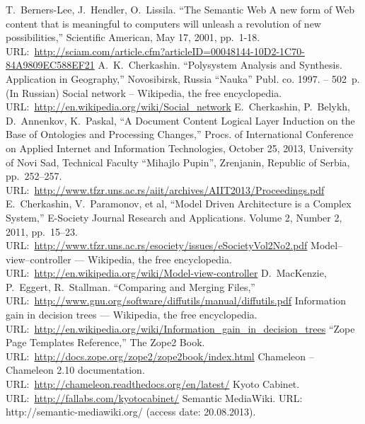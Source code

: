 \documentclass[conference]{IEEEtran}
\begin{document}
%
%
%
\vspace{1.4em} %
\begin{thebibliography}{11}
 T.~Berners-Lee, J.~Hendler, O.~Lissila. ``The
  Semantic Web A new form of Web content that is meaningful to
  computers will unleash a revolution of new possibilities,''
  Scientific American, May 17, 2001,
  pp.~1-18. URL:~\url{http://sciam.com/article.cfm?articleID=00048144-10D2-1C70-84A9809EC588EF21}
 A.~K.~Cherkashin. ``Polysystem Analysis and
  Synthesis. Application in Geography,'' Novosibirsk, Russia ``Nauka'' Publ. co.
  1997. -- 502~p. (In Russian)
 Social network -- Wikipedia, the free encyclopedia.
  URL:~\url{http://en.wikipedia.org/wiki/Social_network}
 E.~Cherkashin, P.~Belykh, D.~Annenkov, K.~Paskal, ``A
  Document Content Logical Layer Induction on the Base of Ontologies
  and Processing Changes,'' Procs. of International Conference on
  Applied Internet and Information Technologies, October 25, 2013,
  University of Novi Sad, Technical Faculty ``Mihajlo Pupin'',
  Zrenjanin, Republic of Serbia,
  pp.~252--257. URL:~\url{http://www.tfzr.uns.ac.rs/aiit/archives/AIIT2013/Proceedings.pdf}
 E.~Cherkashin, V.~Paramonov, et al, ``Model Driven
  Architecture is a Complex System,'' E-Society Journal Research and
  Applications. Volume 2, Number 2, 2011, pp.~15--23.
  URL:~\url{http://www.tfzr.uns.ac.rs/esociety/issues/eSocietyVol2No2.pdf}
 Model--view--controller --- Wikipedia, the free
  encyclopedia.
  URL:~\url{http://en.wikipedia.org/wiki/Model-view-controller}
 D.~MacKenzie, P.~Eggert, R.~Stallman. ``Comparing and
  Merging Files,''
  URL:~\url{http://www.gnu.org/software/diffutils/manual/diffutils.pdf}
 Information gain in decision trees ---  Wikipedia, the free
  encyclopedia. URL:~\url{http://en.wikipedia.org/wiki/Information_gain_in_decision_trees}
 ``Zope Page Templates Reference,'' The Zope2 Book. URL:~\url{http://docs.zope.org/zope2/zope2book/index.html}
 Chameleon -- Chameleon 2.10 documentation.
  URL:~\url{http://chameleon.readthedocs.org/en/latest/}
 Kyoto Cabinet. URL:~\url{http://fallabs.com/kyotocabinet/}
\bibitem{}
 Semantic MediaWiki. URL: http://semantic-mediawiki.org/ (access date: 20.08.2013).


\end{thebibliography}
\end{document}
